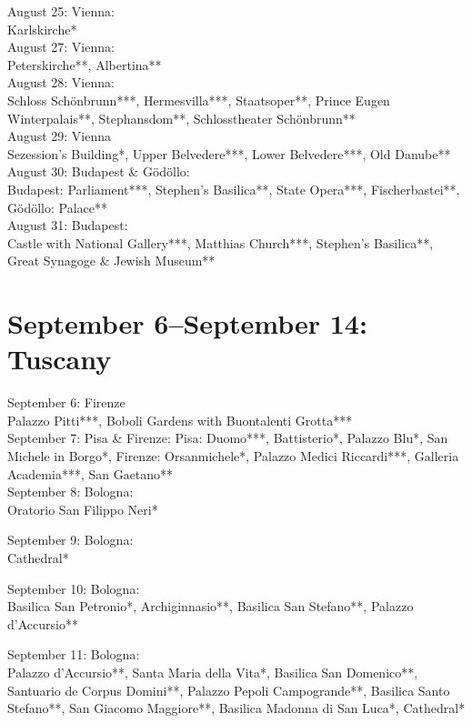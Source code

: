 August 25: Vienna:\\
Karlskirche*\\

August 27: Vienna:\\
Peterskirche**, Albertina**\\

August 28: Vienna:\\
Schloss Sch\"onbrunn***, Hermesvilla***, Staatsoper**, Prince Eugen Winterpalais**, Stephansdom**, Schlosstheater Sch\"onbrunn**\\

August 29: Vienna\\
Sezession's Building*, Upper Belvedere***, Lower Belvedere***, Old Danube**\\

August 30: Budapest \& G\"od\"ollo:\\
Budapest: Parliament***, Stephen's Basilica**, State Opera***, Fischerbastei**, G\"od\"ollo: Palace**\\

August 31: Budapest:\\
Castle with National Gallery***, Matthias Church***, Stephen's Basilica**, Great Synagoge \& Jewish Museum**

\section{September 6--September 14: Tuscany}
\label{Tuscany2014}

September 6: Firenze\\
Palazzo Pitti***, Boboli Gardens with Buontalenti Grotta***\\

September 7: Pisa \& Firenze:
Pisa: Duomo***, Battisterio*, Palazzo Blu*, San Michele in Borgo*, Firenze: Orsanmichele*, Palazzo Medici Riccardi***, Galleria Academia***, San Gaetano**\\

September 8: Bologna:\\
Oratorio San Filippo Neri*

September 9: Bologna:\\
Cathedral*

September 10: Bologna:\\
Basilica San Petronio*, Archiginnasio**, Basilica San Stefano**, Palazzo d'Accursio**

September 11: Bologna:\\
Palazzo d'Accursio**, Santa Maria della Vita*, Basilica San Domenico**, Santuario de Corpus Domini**, Palazzo Pepoli Campogrande**, Basilica Santo Stefano**, San Giacomo Maggiore**, Basilica Madonna di San Luca*, Cathedral*\\

